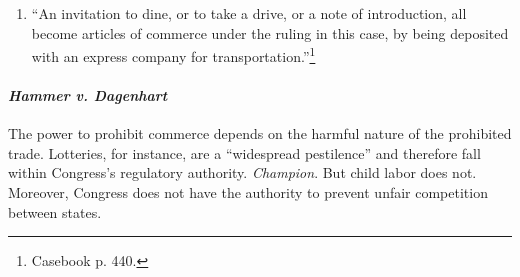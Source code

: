 \begin{enumerate}
\begin{enumerate}
        beyond the reach of Congress's authority to regulate under the 
        commerce clause. This act cannot be valid ``unless the power to 
        regulate interstate commerce includes the absolute and exclusive power 
        to prohibit the transportation of anything or anybody from one State 
        to another~.~.~.~''\footnote{Casebook pp. 439--40.}
        \item ``An invitation to dine, or to take a drive, or a note of 
        introduction, all become articles of commerce under the ruling in this 
        case, by being deposited with an express company for 
        transportation.''\footnote{Casebook p. 440.}
    \end{enumerate}
\end{enumerate}

\paragraph{\emph{Hammer v. Dagenhart}}

The power to prohibit commerce depends on the harmful nature of the prohibited 
trade. Lotteries, for instance, are a ``widespread pestilence'' and therefore 
fall within Congress's regulatory authority. \emph{Champion}. But child labor 
does not. Moreover, Congress does not have the authority to prevent unfair 
competition between states.

